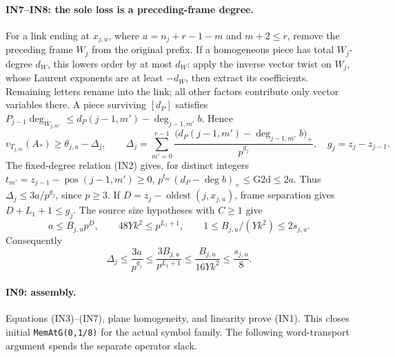 \paragraph{IN7--IN8: the sole loss is a preceding-frame degree.}
For a link ending at $x_{j,u}$, where $u=n_j+r-1-m$ and $m+2\leq r$,
remove the preceding frame $W_j$ from the original prefix.  If a
homogeneous piece has total $W_j$-degree $d_W$, this lowers order by
at most $d_W$: apply the inverse vector twist on $W_j$, whose Laurent
exponents are at least $-d_W$, then extract its coefficients.
Remaining letters rename into the link; all other factors contribute
only vector variables there.  A piece surviving $[d_P]$ satisfies
$P_{j-1}\deg_{W_{j,m'}}\leq d_P(j-1,m')-\deg_{j-1,m'}b$.  Hence
\[
 v_{T_{j,m}}(A_*)\geq\theta_{j,u}-\Delta_j,\qquad
 \Delta_j=\sum_{m'=0}^{r-1}
 \frac{\bigl(d_P(j-1,m')-\deg_{j-1,m'}b\bigr)_+}{p^{g_j}},
 \quad g_j=z_j-z_{j-1}.
 \tag{IN6}
\]
The fixed-degree relation (IN2) gives, for distinct integers
$t_{m'}=z_{j-1}-\operatorname{pos}(j-1,m')\geq0$,
$p^{t_{m'}}(d_P-\deg b)_+\leq\mathrm{G2d}\leq2a$.
Thus $\Delta_j\leq3a/p^{g_j}$, since $p\geq3$.
If $D=z_j-\operatorname{oldest}(j,x_{j,u})$, frame separation gives
$D+L_1+1\leq g_j$.  The source size hypotheses with $C\geq1$ give
\[
 a\leq B_{j,u}p^D,\qquad 48Yk^2\leq p^{L_1+1},\qquad
 1\leq B_{j,u}/(Yk^2)\leq2s_{j,u}.
\]
Consequently
\[
 \Delta_j\leq\frac{3a}{p^{g_j}}
 \leq\frac{3B_{j,u}}{p^{L_1+1}}
 \leq\frac{B_{j,u}}{16Yk^2}\leq\frac{s_{j,u}}8.
 \tag{IN7}
\]

\paragraph{IN9: assembly.}
Equations (IN3)--(IN7), plane homogeneity, and linearity prove (IN1).
This closes initial \texttt{MemAtG(0,1/8)} for the actual symbol family.
The following word-transport argument spends the separate operator slack.
